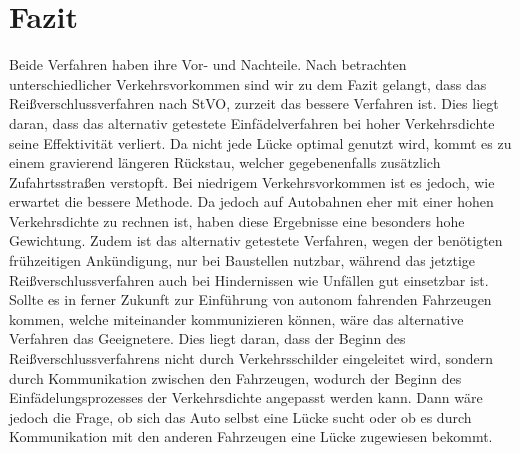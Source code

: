 \chapter{Fazit}
Beide Verfahren haben ihre Vor- und Nachteile. Nach betrachten unterschiedlicher Verkehrsvorkommen sind wir zu dem Fazit gelangt, dass das Reißverschlussverfahren nach StVO, zurzeit das bessere Verfahren ist.
Dies liegt daran, dass das alternativ getestete Einf\"adelverfahren bei hoher Verkehrsdichte seine Effektivität verliert. Da nicht jede Lücke optimal genutzt wird, kommt es zu einem gravierend längeren Rückstau, welcher gegebenenfalls zusätzlich Zufahrtsstraßen verstopft. Bei niedrigem Verkehrsvorkommen ist es jedoch, wie erwartet die bessere Methode. Da jedoch auf Autobahnen eher mit einer hohen Verkehrsdichte zu rechnen ist, haben diese Ergebnisse eine besonders hohe Gewichtung. Zudem ist das alternativ getestete Verfahren, wegen der benötigten frühzeitigen Ankündigung, nur bei Baustellen nutzbar, während das jetztige Reißverschlussverfahren auch bei Hindernissen wie Unfällen gut einsetzbar ist.\\
Sollte es in ferner Zukunft zur Einführung von autonom fahrenden Fahrzeugen kommen, welche miteinander kommunizieren können, wäre das alternative Verfahren das Geeignetere. Dies liegt daran, dass der Beginn des Reißverschlussverfahrens nicht durch Verkehrsschilder eingeleitet wird, sondern durch Kommunikation zwischen den Fahrzeugen, wodurch der Beginn des Einfädelungsprozesses der Verkehrsdichte angepasst werden kann. Dann wäre jedoch die Frage, ob sich das Auto selbst eine Lücke sucht oder ob es durch Kommunikation mit den anderen Fahrzeugen eine Lücke zugewiesen bekommt. 